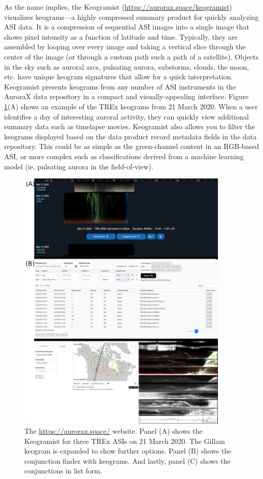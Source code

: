 \documentclass[utf8]{FrontiersinHarvard} %
\begin{document}
As the name implies, the Keogramist (\url{https://aurorax.space/keogramist}) visualizes keograms---a highly compressed summary product for quickly analyzing ASI data. It is a compression of sequential ASI images into a single image that shows pixel intensity as a function of latitude and time. Typically, they are assembled by looping over every image and taking a vertical slice through the center of the image (or through a custom path such a path of a satellite). Objects in the sky such as auroral arcs, pulsating aurora, substorms, clouds, the moon, etc. have unique keogram signatures that allow for a quick interpretation. Keogramist presents keograms from any number of ASI instruments in the AuroraX data repository in a compact and visually-appealing interface. Figure \ref{fig1}(A) shows an example of the TREx keograms from 21 March 2020. When a user identifies a day of interesting auroral activity, they can quickly view additional summary data such as timelapse movies. Keogramist also allows you to filter the keograms displayed based on the data product record metadata fields in the data repository. This could be as simple as the green-channel content in an RGB-based ASI, or more complex such as classifications derived from a machine learning model (ie. pulsating aurora in the field-of-view).

\begin{figure}
    \centering
    \includegraphics[width=0.9\textwidth]{figures/fig1.jpg}
    \caption{The \url{https://aurorax.space/} website. Panel (A) shows the Keogramist for three TREx ASIs on 21 March 2020. The Gillam keogram is expanded to show further options. Panel (B) shows the conjunction finder with keograms. And lastly, panel (C) shows the conjunctions in list form.}
    \label{fig1}
\end{figure}
\end{document}
